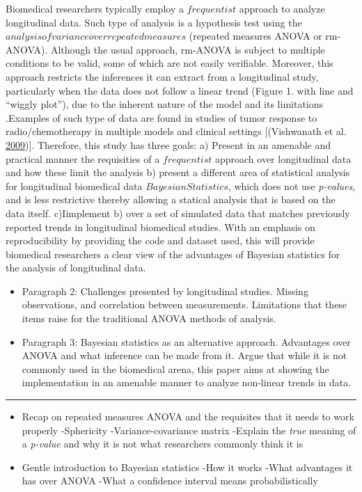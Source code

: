 \documentclass[
]{article}
\begin{document}
Biomedical researchers typically employ a \(frequentist\) approach to
analyze longitudinal data. Such type of analysis is a hypothesis test
using the \(analysis of variance over repeated measures\) (repeated
measures ANOVA or rm-ANOVA). Although the usual approach, rm-ANOVA is
subject to multiple conditions to be valid, some of which are not easily
verifiable. Moreover, this approach restricts the inferences it can
extract from a longitudinal study, particularly when the data does not
follow a linear trend (Figure 1. with line and ``wiggly plot''), due to
the inherent nature of the model and its limitations .Examples of such
type of data are found in studies of tumor response to
radio/chemotherapy in multiple models and clinical settings
{[}(Vishwanath et al. \protect\hyperlink{ref-vishwanath2009}{2009}){]}.
Therefore, this study has three goals: a) Present in an amenable and
practical manner the requisities of a \(frequentist\) approach over
longitudinal data and how these limit the analysis b) present a
different area of statistical analysis for longitudinal biomedical data
\(Bayesian Statistics\), which does not use \emph{p-values}, and is less
restrictive thereby allowing a statical analysis that is based on the
data itself. c)Iimplement b) over a set of simulated data that matches
previously reported trends in longitudinal biomedical studies. With an
emphasis on reproducibility by providing the code and dataset used, this
will provide biomedical researchers a clear view of the advantages of
Bayesian statistics for the analysis of longitudinal data.

\begin{itemize}
\item
  Paragraph 2: Challenges presented by longitudinal studies. Missing
  observations, and correlation between measurements. Limitations that
  these items raise for the traditional ANOVA methods of analysis.
\item
  Paragraph 3: Bayesian statistics as an alternative approach.
  Advantages over ANOVA and what inference can be made from it. Argue
  that while it is not commonly used in the biomedical arena, this paper
  aims at showing the implementation in an amenable manner to analyze
  non-linear trends in data.
\end{itemize}

\begin{center}\rule{0.5\linewidth}{0.5pt}\end{center}

\begin{itemize}
\item
  Recap on repeated measures ANOVA and the requisites that it needs to
  work properly -Sphericity -Variance-covariance matrix -Explain the
  \emph{true} meaning of a \emph{p-value} and why it is not what
  researchers commonly think it is
\item
  Gentle introduction to Bayesian statistics -How it works -What
  advantages it has over ANOVA -What a confidence interval means
  probabilistically
\end{itemize}
\end{document}
